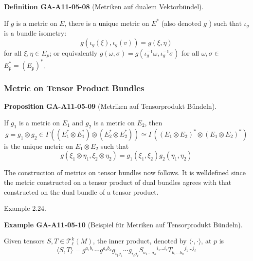 \documentclass[10pt, letterpaper]{article}
\newcommand{\CustomHeading}[3]{%
  \par\medskip\noindent%
  \textbf{#1 #2} \textnormal{(#3)}.\enskip%
}
\newenvironment{DEF}[2]{\begin{unitbox}\CustomHeading{Definition}{#1}{#2}}{\end{unitbox}}
\newenvironment{PROP}[2]{\begin{unitbox}\CustomHeading{Proposition}{#1}{#2}}{\end{unitbox}}
\newenvironment{EXA}[2]{\begin{unitbox}\CustomHeading{Example}{#1}{#2}}{\end{unitbox}}
\begin{document}
\begin{DEF}{GA-A11-05-08}{Metriken auf dualem Vektorbündel}
If $g$ is a metric on $E$, there is a unique metric on $E^{*}$ (also denoted $g$ ) such that $\iota_{g}$ is a bundle isometry:
$$
g\left(\iota_{g}(\xi), \iota_{g}(v)\right)=g(\xi, \eta)
$$
for all $\xi, \eta \in E_{p}$; or equivalently $g(\omega, \sigma)=g\left(\iota_{g}^{-1} \omega, \iota_{g}^{-1} \sigma\right)$ for all $\omega, \sigma \in$ $E_{p}^{*}=\left(E_{p}\right)^{*}$.
\end{DEF}

\subsubsection*{Metric on Tensor Product Bundles}


\begin{PROP}{GA-A11-05-09}{Metriken auf Tensorprodukt Bündeln}
If $g_{1}$ is a metric on $E_{1}$ and $g_{2}$ is a metric on $E_{2}$, then
$$
g=g_{1} \otimes g_{2} \in \Gamma\left(\left(E_{1}^{*} \otimes E_{1}^{*}\right) \otimes\left(E_{2}^{*} \otimes E_{2}^{*}\right)\right) \simeq \Gamma\left(\left(E_{1} \otimes E_{2}\right)^{*} \otimes\left(E_{1} \otimes E_{2}\right)^{*}\right)
$$
is the unique metric on $E_{1} \otimes E_{2}$ such that
$$
g\left(\xi_{1} \otimes \eta_{1}, \xi_{2} \otimes \eta_{2}\right)=g_{1}\left(\xi_{1}, \xi_{2}\right) g_{2}\left(\eta_{1}, \eta_{2}\right)
$$
\end{PROP}



The construction of metrics on tensor bundles now follows. It is welldefined since the metric constructed on a tensor product of dual bundles agrees with that constructed on the dual bundle of a tensor product.

Example 2.24. 


\begin{EXA}{GA-A11-05-10}{Beispiel für Metriken auf Tensorprodukt Bündeln}
Given tensors $S, T \in \mathscr{T}_{\ell}^{k}(M)$, the inner product, denoted by $\langle\cdot, \cdot\rangle$, at $p$ is
$$
\langle S, T\rangle=g^{a_{1} b_{1}} \cdots g^{a_{k} b_{k}} g_{i_{1} j_{1}} \cdots g_{i_{\ell} j_{\ell}} S_{a_{1} \ldots a_{k}}{ }^{i_{1} \ldots i_{\ell}} T_{b_{1} \ldots b_{k}}{ }^{j_{1} \ldots j_{\ell}}
$$
\end{EXA}
\end{document}
